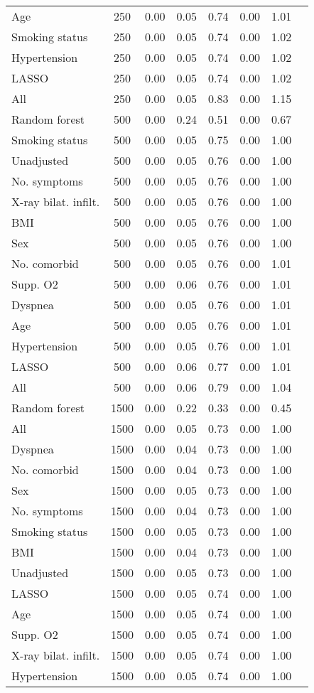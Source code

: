 \documentclass{article}
\begin{document}
{\begin{longtable}{lccccccc}
Age & 250 & 0.00 & 0.05 & 0.74 & 0.00 & 1.01 \\ 
Smoking status & 250 & 0.00 & 0.05 & 0.74 & 0.00 & 1.02 \\ 
Hypertension & 250 & 0.00 & 0.05 & 0.74 & 0.00 & 1.02 \\ 
LASSO & 250 & 0.00 & 0.05 & 0.74 & 0.00 & 1.02 \\ 
All & 250 & 0.00 & 0.05 & 0.83 & 0.00 & 1.15 \\ \midrule() 
Random forest & 500 & 0.00 & 0.24 & 0.51 & 0.00 & 0.67 \\ 
Smoking status & 500 & 0.00 & 0.05 & 0.75 & 0.00 & 1.00 \\ 
Unadjusted & 500 & 0.00 & 0.05 & 0.76 & 0.00 & 1.00 \\ 
No. symptoms & 500 & 0.00 & 0.05 & 0.76 & 0.00 & 1.00 \\ 
X-ray bilat. infilt. & 500 & 0.00 & 0.05 & 0.76 & 0.00 & 1.00 \\ 
BMI & 500 & 0.00 & 0.05 & 0.76 & 0.00 & 1.00 \\ 
Sex & 500 & 0.00 & 0.05 & 0.76 & 0.00 & 1.00 \\ 
No. comorbid & 500 & 0.00 & 0.05 & 0.76 & 0.00 & 1.01 \\ 
Supp. O2 & 500 & 0.00 & 0.06 & 0.76 & 0.00 & 1.01 \\ 
Dyspnea & 500 & 0.00 & 0.05 & 0.76 & 0.00 & 1.01 \\ 
Age & 500 & 0.00 & 0.05 & 0.76 & 0.00 & 1.01 \\ 
Hypertension & 500 & 0.00 & 0.05 & 0.76 & 0.00 & 1.01 \\ 
LASSO & 500 & 0.00 & 0.06 & 0.77 & 0.00 & 1.01 \\ 
All & 500 & 0.00 & 0.06 & 0.79 & 0.00 & 1.04 \\ \midrule() 
Random forest & 1500 & 0.00 & 0.22 & 0.33 & 0.00 & 0.45 \\ 
All & 1500 & 0.00 & 0.05 & 0.73 & 0.00 & 1.00 \\ 
Dyspnea & 1500 & 0.00 & 0.04 & 0.73 & 0.00 & 1.00 \\ 
No. comorbid & 1500 & 0.00 & 0.04 & 0.73 & 0.00 & 1.00 \\ 
Sex & 1500 & 0.00 & 0.05 & 0.73 & 0.00 & 1.00 \\ 
No. symptoms & 1500 & 0.00 & 0.04 & 0.73 & 0.00 & 1.00 \\ 
Smoking status & 1500 & 0.00 & 0.05 & 0.73 & 0.00 & 1.00 \\ 
BMI & 1500 & 0.00 & 0.04 & 0.73 & 0.00 & 1.00 \\ 
Unadjusted & 1500 & 0.00 & 0.05 & 0.73 & 0.00 & 1.00 \\ 
LASSO & 1500 & 0.00 & 0.05 & 0.74 & 0.00 & 1.00 \\ 
Age & 1500 & 0.00 & 0.05 & 0.74 & 0.00 & 1.00 \\ 
Supp. O2 & 1500 & 0.00 & 0.05 & 0.74 & 0.00 & 1.00 \\ 
X-ray bilat. infilt. & 1500 & 0.00 & 0.05 & 0.74 & 0.00 & 1.00 \\ 
Hypertension & 1500 & 0.00 & 0.05 & 0.74 & 0.00 & 1.00 \\
\bottomrule
\hline
\end{longtable}
}
\end{document}
